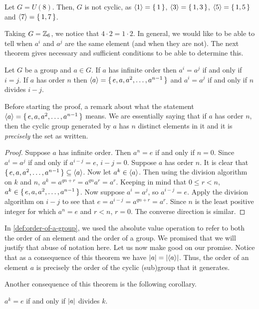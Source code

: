 \documentclass[./main.tex]{subfiles}
\begin{document}
\begin{example}
    Let $G = U(8)$. Then, $G$ is not cyclic, as ${ \langle 1 \rangle } = \set{1}$, ${ \langle 3 \rangle } =
    \set{1, 3}$, ${ \langle 5 \rangle } = \set{1,5}$ and ${ \langle 7 \rangle } = \set{1,7}$.
\end{example}

Taking $G = \mathbb{Z}_6$, we notice that $4 \cdot 2 = 1 \cdot 2$. In general, we would
like to be able to tell when $a^i$ and $a^j$ are the same element (and when they
are not). The next theorem gives necessary and sufficient conditions to be able
to determine this.

\begin{theorem}
    Let $G$ be a group and $a \in G$. If $a$ has infinite order then $a^i = a^j$
    if and only if $i=j$. If $a$ has order $n$ then ${ \langle a \rangle } = \set{e, a, a^2,
    \dots, a^{n-1}}$ and $a^i = a^j$ if and only if $n$ divides $i-j$.
\end{theorem}
Before starting the proof, a remark about what the statement ${ \langle a \rangle } = \set{e,
a, a^2, \dots, a^{n-1}}$ means. We are essentially saying that if $a$ has order
$n$, then the cyclic group generated by $a$ has $n$ distinct elements in it and
it is \emph{precisely} the set as written.
\begin{proof}
    Suppose $a$ has infinite order. Then $a^n = e$ if and only if $n=0$. Since
    $a^i = a^j$ if and only if $a^{i-j} = e$, $i-j=0$. Suppose $a$ has order
    $n$. It is clear that $\set{e, a, a^2, \dots, a^{n-1}} \subseteq { \langle a \rangle }$.
    Now let $a^k \in { \langle a \rangle }$. Then using the division algorithm on $k$ and $n$,
    $a^k = a^{qn + r} = a^{qn} a^r = a^r$. Keeping in mind that $0 \leq r < n$,
    $a^k \in \set{e, a, a^2, \dots, a^{n-1}}$. Now suppose $a^i = a^j$, so
    $a^{i-j} = e$. Apply the division algorithm on $i-j$ to see that $e =
    a^{i-j} = a^{qn + r} = a^r$. Since $n$ is the least positive integer for
    which $a^n = e$ and $r < n$, $r=0$. The converse direction is similar.
\end{proof}

In \cref{def:order-of-a-group}, we used the absolute value operation to refer to
both the order of an element and the order of a group. We promised that we will
justify that abuse of notation here. Let us now make good on our promise. Notice
that as a consequence of this theorem we have $\abs{a} = \abs{\gen{a}}$. Thus,
the order of an element $a$ is precisely the order of the cyclic (sub)group that
it generates. 

Another consequence of this theorem is the following corollary.
\begin{corollary}
    $a^k = e$ if and only if $\abs{a}$ divides $k$. 
\end{corollary}
\end{document}
